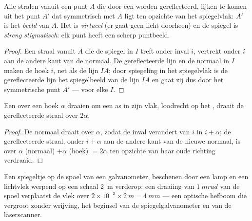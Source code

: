 \begin{proposition}\label{prop:b1:rays-reflection-refraction:mirror}
Alle stralen vanuit een punt $A$ die door een  worden
gereflecteerd, lijken te komen uit het punt $A'$ dat symmetrisch met $A$ ligt
ten opzichte van het spiegelvlak: $A'$ is het \emph{beeld} van $A$. Het is
\emph{virtueel} (er gaat geen licht doorheen) en de spiegel is \emph{streng
stigmatisch}: elk punt heeft een scherp puntbeeld.
\end{proposition}

\begin{proof}
Een straal vanuit $A$ die de spiegel in $I$ treft onder inval $i$, vertrekt
onder $i$ aan de andere kant van de normaal. De gereflecteerde lijn en de
normaal in $I$ maken de hoek $i$, net als de lijn $IA$; door spiegeling in het
spiegelvlak is de gereflecteerde lijn het spiegelbeeld van de lijn $IA$ en
gaat zij dus door het symmetrische punt $A'$ --- voor elke $I$.
\end{proof}

\begin{proposition}\label{prop:b1:rays-reflection-refraction:rotation}
Een  over een hoek $\alpha$ draaien om een as in zijn vlak,
loodrecht op het , draait de gereflecteerde straal over $2\alpha$.
\end{proposition}

\begin{proof}
De normaal draait over $\alpha$, zodat de inval verandert van $i$ in
$i + \alpha$; de gereflecteerde straal, onder $i + \alpha$ aan de andere kant
van de nieuwe normaal, is over $\alpha$ (normaal) $+ \alpha$ (hoek) $=
2\alpha$ ten opzichte van haar oude richting verdraaid.
\end{proof}

\begin{example}\label{ex:b1:rays-reflection-refraction:galvanometer}
Een spiegeltje op de spoel van een galvanometer, beschenen door een lamp en een
lichtvlek werpend op een schaal \qty{2}{m} verderop: een draaiing van
$\qty{1}{mrad}$ van de spoel verplaatst de vlek over $2 \times 10^{-3} \times
\qty{2}{m} = \qty{4}{mm}$ --- een optische hefboom die vergroot zonder
wrijving, het beginsel van de spiegelgalvanometer en van de laserscanner.
\end{example}

